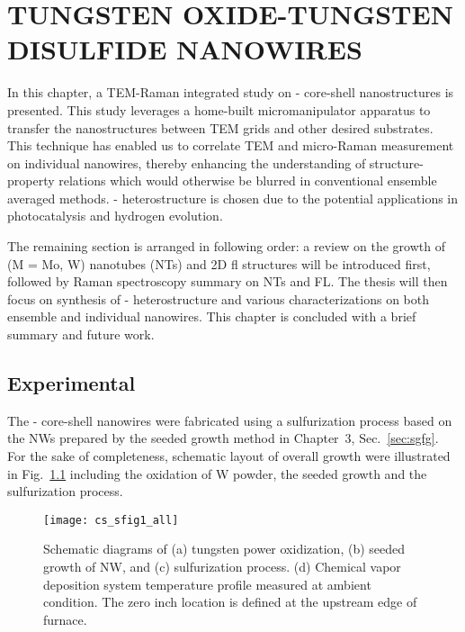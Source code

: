 \chapter{TUNGSTEN OXIDE-TUNGSTEN DISULFIDE NANOWIRES}

In this chapter, a TEM-Raman integrated study on - core-shell nanostructures is presented. This study leverages a home-built micromanipulator apparatus to transfer the nanostructures between TEM grids and other desired substrates. This technique has enabled us to correlate TEM and micro-Raman measurement on individual nanowires, thereby enhancing the understanding of structure-property relations which would otherwise be blurred in conventional ensemble averaged methods. - heterostructure is chosen due to the potential applications in photocatalysis and hydrogen evolution. 

The remaining section is arranged in following order: a review on the growth of  (M = Mo, W) nanotubes (NTs) and 2D \gls{fl} structures will be introduced first, followed by Raman spectroscopy summary on  NTs and FL. The thesis will then focus on synthesis of - heterostructure and various characterizations on both ensemble and individual nanowires. This chapter is concluded with a brief summary and future work.



\section{Experimental}

The - core-shell nanowires were fabricated using a sulfurization process based on the  NWs prepared by the seeded growth method in Chapter~3, Sec.~\ref{sec:sgfg}. For the sake of completeness, schematic layout of overall growth were illustrated in Fig.~\ref{fig:ch5grow} including the oxidation of W powder, the seeded growth and the sulfurization process.

\begin{figure}[htb]
\centering
\texttt{[image: cs\_sfig1\_all]}
\caption[Schematic diagrams of tungsten power oxidization, seeded growth of  NW, and sulfurization process]{Schematic diagrams of (a) tungsten power oxidization, (b) seeded growth of  NW, and (c) sulfurization process. (d) Chemical vapor deposition system temperature profile measured at ambient condition. The zero inch location is defined at the upstream edge of furnace.}
\label{fig:ch5grow}
\end{figure}

